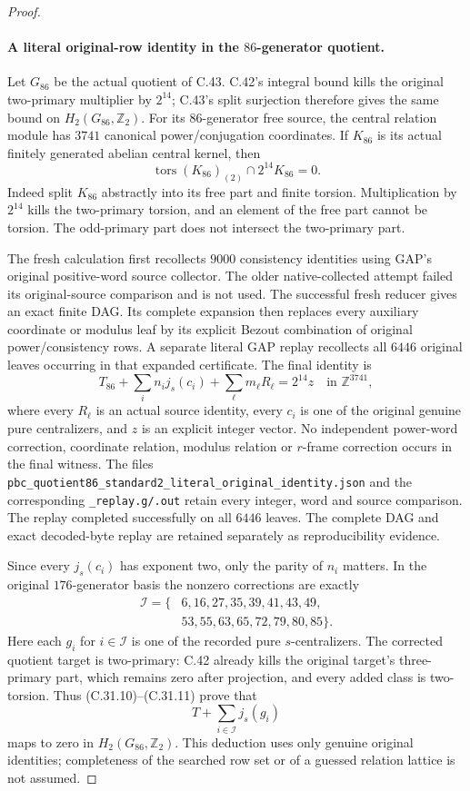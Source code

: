 \begin{proof}
\paragraph{A literal original-row identity in the $86$-generator quotient.}
Let $G_{86}$ be the actual quotient of C.43. C.42's integral
bound kills the original two-primary multiplier by $2^{14}$;
C.43's split surjection therefore gives the same bound on
$H_2(G_{86},\mathbb Z_2)$. For its $86$-generator free source,
the central relation module has $3741$ canonical power/conjugation
coordinates. If $K_{86}$ is its actual finitely generated abelian
central kernel, then
\[
 \operatorname{tors}(K_{86})_{(2)}\cap 2^{14}K_{86}=0.
 \tag{C.31.10}
\]
Indeed split $K_{86}$ abstractly into its free part and finite
torsion. Multiplication by $2^{14}$ kills the two-primary torsion,
and an element of the free part cannot be torsion. The odd-primary
part does not intersect the two-primary part.

The fresh calculation first recollects $9000$ consistency identities
using GAP's original positive-word source collector. The older
native-collected attempt failed its original-source comparison and
is not used. The successful fresh reducer gives an exact finite
DAG. Its complete expansion then replaces every auxiliary coordinate
or modulus leaf by its explicit Bezout combination of original
power/consistency rows. A separate literal GAP replay recollects all
$6446$ original leaves occurring in that expanded certificate.
The final identity is
\[
 T_{86}+\sum_i n_i j_s(c_i) +\sum_\ell m_\ell R_\ell
                      =2^{14}z\quad\text{in }\mathbb Z^{3741},
 \tag{C.31.11}
\]
where every $R_\ell$ is an actual source identity, every $c_i$ is
one of the original genuine pure centralizers, and $z$ is an
explicit integer vector. No independent power-word correction,
coordinate relation, modulus relation or $r$-frame correction
occurs in the final witness. The files
\texttt{pbc\_quotient86\_standard2\_literal\_original\_identity.json}
and the corresponding \texttt{\_replay.g/.out} retain every integer,
word and source comparison. The replay completed successfully on
all $6446$ leaves. The complete DAG and exact decoded-byte replay
are retained separately as reproducibility evidence.

Since every $j_s(c_i)$ has exponent two, only the parity of $n_i$
matters. In the original $176$-generator basis the nonzero corrections
are exactly
\[
\begin{split}
 \mathcal I=\{&6,16,27,35,39,41,43,49,\\
              &53,55,63,65,72,79,80,85\}.
\end{split}
 \tag{C.31.12}
\]
Here each $g_i$ for $i\in\mathcal I$ is one of the recorded pure
$s$-centralizers. The corrected quotient target is two-primary:
C.42 already kills the original target's three-primary part,
which remains zero after projection, and every added class is
two-torsion. Thus (C.31.10)--(C.31.11) prove that
\[
                   T+\sum_{i\in\mathcal I}j_s(g_i)
 \tag{C.31.13}
\]
maps to zero in $H_2(G_{86},\mathbb Z_2)$. This deduction uses
only genuine original identities; completeness of the searched
row set or of a guessed relation lattice is not assumed.


\end{proof}
